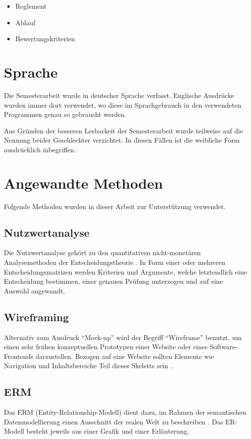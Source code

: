 \begin{itemize}
    \item Reglement \cite{hsz_reglement}
    \item Ablauf \cite{hsz_ablauf}
    \item Bewertungskriterien \cite{hsz_bewertungskriterien}
\end{itemize}

\section{Sprache}
Die Semesterarbeit wurde in deutscher Sprache verfasst. Englische Ausdrücke 
wurden immer dort verwendet, wo diese im Sprachgebrauch in den verwendeten 
Programmen genau so gebraucht werden.

Aus Gründen der besseren Lesbarkeit der Semesterarbeit wurde teilweise auf 
die Nennung beider Geschlechter verzichtet. In diesen Fällen ist die 
weibliche Form ausdrücklich inbegriffen.

\section{Angewandte Methoden}
Folgende Methoden wurden in dieser Arbeit zur Unterstützung verwendet. 

\subsection{Nutzwertanalyse}
Die Nutzwertanalyse gehört zu den quantitativen nicht-monetären Analysemethoden 
der Entscheidungstheorie \cite{nutzwertanalyse}. In Form einer oder mehreren 
Entscheidungsmatrizen werden Kriterien und Argumente, welche letztendlich eine 
Entscheidung bestimmen, einer genauen Prüfung unterzogen und auf eine Auswahl 
angewandt.

\subsection{Wireframing}
Alternativ zum Ausdruck ``Mock-up'' wird der Begriff ``Wireframe'' benutzt, um einen 
sehr frühen konzeptuellen Prototypen einer Website oder eines Software-Frontends 
darzustellen. Bezogen auf eine Website sollten Elemente wie Navigation und 
Inhaltsbereiche Teil dieses Skeletts sein \cite{wireframe}.

\subsection{ERM}
Das ERM (Entity-Relationship-Modell) dient dazu, im Rahmen der semantischen 
Datenmodellierung einen Ausschnitt der realen Welt zu beschreiben \cite{erm}. 
Das ER-Modell besteht jeweils aus einer Grafik und einer Erläuterung.
